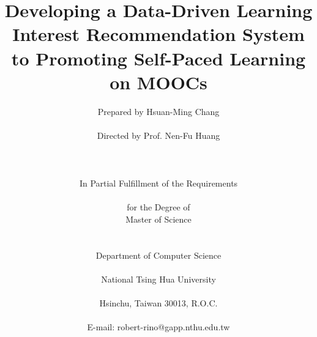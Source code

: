 \title{Developing a Data-Driven Learning Interest Recommendation System to Promoting Self-Paced Learning on MOOCs}
\author{
    Prepared by Hsuan-Ming Chang\\ \\
    Directed by Prof. Nen-Fu Huang\\ \\ \\ \\
    In Partial Fulfillment of the Requirements\\ \\
    for the Degree of\\
    Master of Science \\ \\ \\
    Department of Computer Science\\ \\
    National Tsing Hua University \\ \\
    Hsinchu, Taiwan 30013, R.O.C.\\ \\
    E-mail: robert-rino@gapp.nthu.edu.tw\\
}
